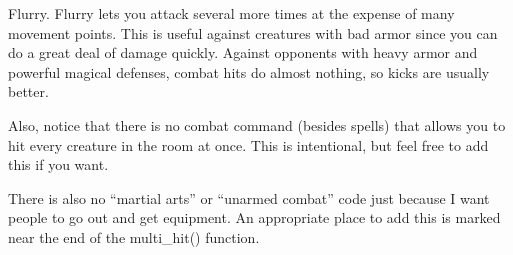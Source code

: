 \bul Flurry. Flurry lets you attack several more times at the expense
of many movement points. This is useful against creatures with bad
armor since you can do a great deal of damage quickly. Against
opponents with heavy armor and powerful magical defenses, combat hits
do almost nothing, so kicks are usually better.

Also, notice that there is no combat command (besides spells) that allows
you to hit every creature in the room at once. This is intentional,
but feel free to add this if you want.

There is also no ``martial arts'' or ``unarmed combat'' code just because
I want people to go out and get equipment. An appropriate place
to add this is marked near the end of the multi\_hit() function.
